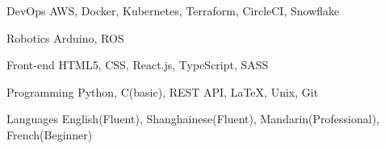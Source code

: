 

\begin{cvskills}

  \cvskill
    {DevOps} %
    {AWS, Docker, Kubernetes, Terraform, CircleCI, Snowflake} %

  \cvskill
    {Robotics} %
    {Arduino, ROS} %

  \cvskill
    {Front-end} %
    {HTML5, CSS, React.js, TypeScript, SASS} %

  \cvskill
    {Programming} %
    {Python, C(basic), REST API, LaTeX, Unix, Git} %

  \cvskill
    {Languages} %
    {English(Fluent), Shanghainese(Fluent), Mandarin(Professional), French(Beginner)} %

\end{cvskills}
